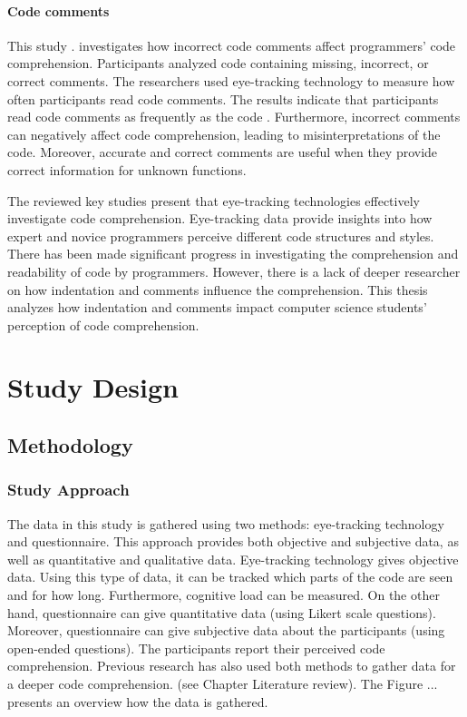 \subsubsection{Code comments} 

This study \citet{bakhuizen2019comments}. investigates how incorrect code comments affect programmers' code comprehension. Participants analyzed code containing missing, incorrect, or correct comments.
The researchers used eye-tracking technology to measure how often participants read code comments. The results indicate that participants read code comments as frequently as the code \citet{bakhuizen2019comments}. Furthermore, incorrect comments can negatively affect code comprehension, leading to misinterpretations of the code. Moreover, accurate and correct comments are useful when they provide correct information for unknown functions. 

The reviewed key studies present that eye-tracking technologies effectively investigate code comprehension.  Eye-tracking data provide insights into how expert and novice programmers perceive different code structures and styles. There has been made significant progress in investigating the comprehension and readability of code by programmers.  However, there is a lack of deeper researcher on how indentation and comments influence the comprehension. 
This thesis analyzes how indentation and comments impact computer science students’ perception of code comprehension.  


\chapter{Study Design}



\section{Methodology}

\subsection{Study Approach}

The data in this study is gathered using two methods: eye-tracking technology and questionnaire. This approach provides both objective and subjective data, as well as quantitative and qualitative data.
Eye-tracking technology gives objective data. Using this type of data, it can be tracked which parts of the code are seen and for how long. Furthermore, cognitive load can be measured.
On the other hand, questionnaire can give quantitative data (using Likert scale questions). Moreover, questionnaire can give subjective data about the participants (using open-ended questions). The participants report their perceived code comprehension.  
Previous research has also used both methods to gather data for a deeper code comprehension. (see Chapter Literature review). The Figure ... presents an overview how the data is gathered. 



